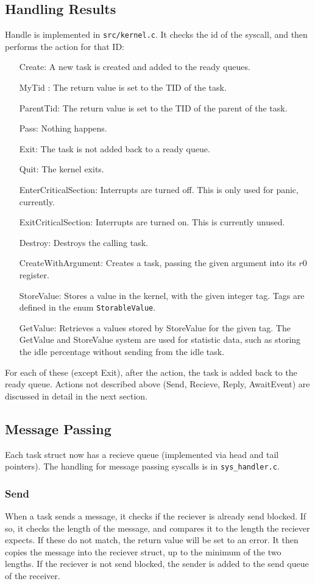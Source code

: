 \documentclass{article}
\begin{document}
\subsection{Handling Results}
Handle is implemented in \verb|src/kernel.c|. It checks the id of the syscall, and then performs the action for that ID:
\begin{enumerate}
\item[Create:] A new task is created and added to the ready queues.
\item[MyTid]: The return value is set to the TID of the task.
\item[ParentTid:] The return value is set to the TID of the parent of the task.
\item[Pass:] Nothing happens.
\item[Exit:] The task is not added back to a ready queue.
\item[Quit:] The kernel exits.
\item[EnterCriticalSection:] Interrupts are turned off. This is only used for panic, currently.
\item[ExitCriticalSection:] Interrupts are turned on. This is currently unused.
\item[Destroy:] Destroys the calling task.
\item[CreateWithArgument:] Creates a task, passing the given argument into its $r0$ register.
\item[StoreValue:] Stores a value in the kernel, with the given integer tag. Tags are defined in the enum \verb|StorableValue|.
\item[GetValue:] Retrieves a values stored by StoreValue for the given tag. The GetValue and StoreValue system are used for statistic data, such as storing the idle percentage without sending from the idle task.
\end{enumerate}

For each of these (except Exit), after the action, the task is added back to the ready queue. Actions not described above (Send, Recieve, Reply, AwaitEvent) are discussed in detail in the next section.
\subsection{Message Passing}
Each task struct now has a recieve queue (implemented via head and tail pointers). The handling for message passing syscalls is in \verb|sys_handler.c|.
\subsubsection{Send}
    When a task sends a message, it checks if the reciever is already send blocked. If so, it checks the length of the message, and compares it to the length the reciever expects. If these do not match, the return value will be set to an error. It then copies the message into the reciever struct, up to the minimum of the two lengths.
    If the reciever is not send blocked, the sender is added to the send queue of the receiver.
\end{document}

